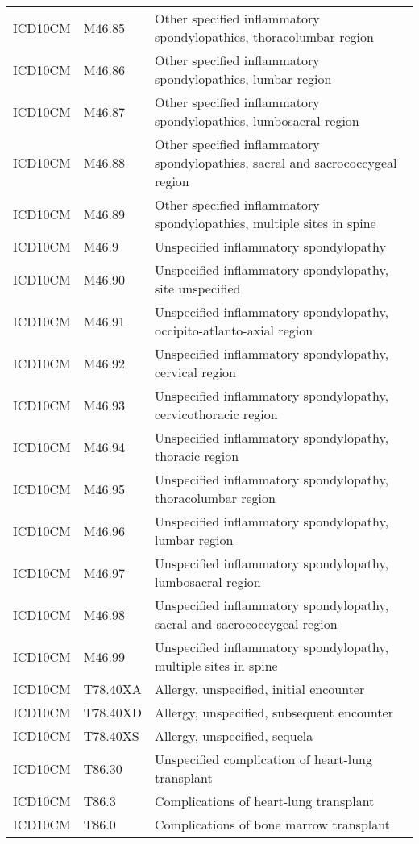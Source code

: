 \begin{table}[ht]
\begin{tabular}{lll}
  ICD10CM & M46.85 & Other specified inflammatory spondylopathies, thoracolumbar region \\ 
  ICD10CM & M46.86 & Other specified inflammatory spondylopathies, lumbar region \\ 
  ICD10CM & M46.87 & Other specified inflammatory spondylopathies, lumbosacral region \\ 
  ICD10CM & M46.88 & Other specified inflammatory spondylopathies, sacral and sacrococcygeal region \\ 
  ICD10CM & M46.89 & Other specified inflammatory spondylopathies, multiple sites in spine \\ 
  ICD10CM & M46.9 & Unspecified inflammatory spondylopathy \\ 
  ICD10CM & M46.90 & Unspecified inflammatory spondylopathy, site unspecified \\ 
  ICD10CM & M46.91 & Unspecified inflammatory spondylopathy, occipito-atlanto-axial region \\ 
  ICD10CM & M46.92 & Unspecified inflammatory spondylopathy, cervical region \\ 
  ICD10CM & M46.93 & Unspecified inflammatory spondylopathy, cervicothoracic region \\ 
  ICD10CM & M46.94 & Unspecified inflammatory spondylopathy, thoracic region \\ 
  ICD10CM & M46.95 & Unspecified inflammatory spondylopathy, thoracolumbar region \\ 
  ICD10CM & M46.96 & Unspecified inflammatory spondylopathy, lumbar region \\ 
  ICD10CM & M46.97 & Unspecified inflammatory spondylopathy, lumbosacral region \\ 
  ICD10CM & M46.98 & Unspecified inflammatory spondylopathy, sacral and sacrococcygeal region \\ 
  ICD10CM & M46.99 & Unspecified inflammatory spondylopathy, multiple sites in spine \\ 
  ICD10CM & T78.40XA & Allergy, unspecified, initial encounter \\ 
  ICD10CM & T78.40XD & Allergy, unspecified, subsequent encounter \\ 
  ICD10CM & T78.40XS & Allergy, unspecified, sequela \\ 
  ICD10CM & T86.30 & Unspecified complication of heart-lung transplant \\ 
  ICD10CM & T86.3 & Complications of heart-lung transplant \\ 
  ICD10CM & T86.0 & Complications of bone marrow transplant \\ 

\end{tabular}
\end{table}
